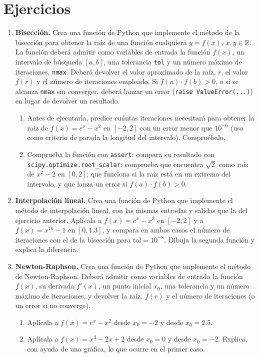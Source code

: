 \section{Ejercicios}
\begin{enumerate}
\item \label{ej:bisec} \textbf{Bisección.} Crea una función de Python que implemente el método de la bisección para obtener la raíz de una función cualquiera $y = f(x)$, $x, y \in \mathbb{R}$. La función deberá admitir como variables de entrada la función $f(x)$, un intervalo de búsqueda $[a,b]$, una tolerancia \texttt{tol} y un número máximo de iteraciones, \texttt{nmax}. Deberá devolver el valor aproximado de la raíz, $r$, el valor $f(r)$ y el número de iteraciones empleado. Si $f(a)\cdot f(b)>0$, o si se alcanza \texttt{nmax} sin converger, deberá lanzar un error (\texttt{raise ValueError(...)}) en lugar de devolver un resultado.
\begin{enumerate}
\item Antes de ejecutarla, predice cuántas iteraciones necesitará para obtener la raíz de $f(x) = e^x-x^2$ en $[-2,2]$ con un error menor que $10^{-6}$ (usa como criterio de parada la longitud del intervalo). Compruébalo.
\item Comprueba la función con \texttt{assert}: compara su resultado con \texttt{scipy.optimize.root\_scalar}; comprueba que encuentra $\sqrt2$ como raíz de $x^2-2$ en $[0, 2]$; que funciona si la raíz está en un extremo del intervalo, y que lanza un error si $f(a)\cdot f(b)>0$.
\end{enumerate}

\item \textbf{Interpolación lineal.} Crea una función de Python que implemente el método de interpolación lineal, con las mismas entradas y salidas que la del ejercicio anterior. Aplícala a $f(x) = e^x-x^2$ en $[-2,2]$ y a $f(x)=x^{10}-1$ en $[0,1.3]$, y compara en ambos casos el número de iteraciones con el de la bisección para $\text{tol}=10^{-8}$. Dibuja la segunda función y explica la diferencia.

\item \textbf{Newton-Raphson.} Crea una función de Python que implemente el método de Newton-Raphson. Deberá admitir como variables de entrada la función $f(x)$, su derivada $f'(x)$, un punto inicial $x_0$, una tolerancia y un número máximo de iteraciones, y devolver la raíz, $f(r)$ y el número de iteraciones (o un error si no converge).
\begin{enumerate}
\item Aplícala a $f(x) = e^x-x^2$ desde $x_0=-2$ y desde $x_0=2.5$.
\item Aplícala a $f(x)=x^3-2x+2$ desde $x_0=0$ y desde $x_0=-2$. Explica, con ayuda de una gráfica, lo que ocurre en el primer caso.
\end{enumerate}


\end{enumerate}

